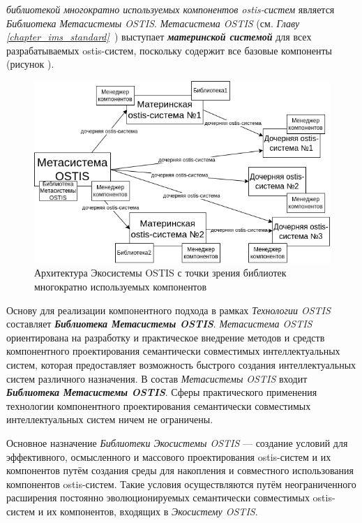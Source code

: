  \textit{библиотекой многократно используемых компонентов ostis-систем} является \textit{Библиотека Метасистемы OSTIS}. \textit{Метасистема OSTIS} (см. \textit{Главу \ref{chapter_ims_standard}~}) выступает \textbf{\textit{материнской системой}} для всех разрабатываемых ostis-систем, поскольку содержит все базовые компоненты (рисунок \textit{}).

\begin{figure}[H]
	\includegraphics[scale=0.8]{author/part5/figures/ecosystem_architecture.png}
	\caption{Архитектура Экосистемы OSTIS с точки зрения библиотек многократно используемых компонентов}
	\label{fig:ecosystem_architecture}
\end{figure}

Основу для реализации компонентного подхода в рамках \textit{Технологии OSTIS} составляет \textbf{\textit{Библиотека Метасистемы OSTIS}}. \textit{Метасистема OSTIS} ориентирована на разработку и практическое внедрение методов и средств компонентного проектирования семантически совместимых интеллектуальных систем, которая предоставляет возможность быстрого создания интеллектуальных систем различного назначения. В состав \textit{Метасистемы OSTIS} входит \textbf{\textit{Библиотека Метасистемы OSTIS}}. Сферы практического применения технологии компонентного проектирования семантически совместимых интеллектуальных систем ничем не ограничены.

Основное назначение \textit{Библиотеки Экосистемы OSTIS} --- создание условий для эффективного, осмысленного и массового проектирования ostis-систем и их компонентов путём создания среды для накопления и совместного использования компонентов ostis-систем. Такие условия осуществляются путём неограниченного расширения постоянно эволюционируемых семантически совместимых ostis-систем и их компонентов, входящих в \textit{Экосистему OSTIS}.

